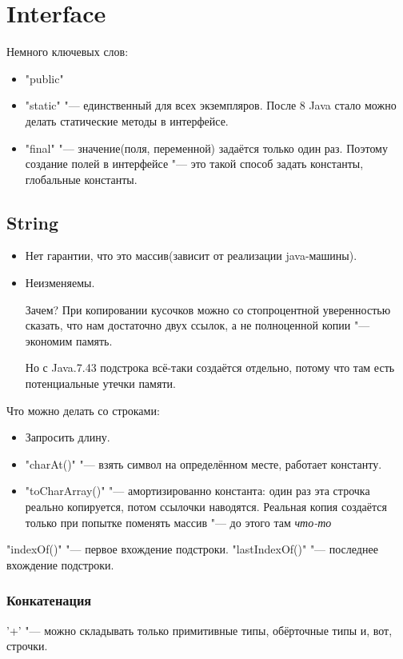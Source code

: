 \chapter{Interface}
Немного ключевых слов:
\begin{itemize}
	\item
		\java"public"
	\item
		\java"static" "--- единственный для всех экземпляров.
			После 8 Java стало можно делать статические методы в интерфейсе.
\item
		\java"final" "--- значение(поля, переменной) задаётся только один раз.
			Поэтому создание полей в интерфейсе "--- 
			это такой способ задать константы, глобальные константы.
		\end{itemize}


\section{String}
\begin{itemize}
	\item
		Нет гарантии, что это массив(зависит от реализации java-машины).
	\item
		Неизменяемы.
		
		Зачем? При копировании кусочков можно со стопроцентной уверенностью сказать, что нам достаточно двух ссылок, а не 
		полноценной копии "--- экономим память.

		Но с Java.7.43 подстрока всё-таки создаётся отдельно, потому что там есть потенциальные утечки памяти.		
\end{itemize}

Что можно делать со строками:
\begin{itemize}
	\item
		Запросить длину.
	\item
		\java"charAt()" "--- взять символ на определённом месте, работает константу.
	\item
		\java"toCharArray()" "--- амортизированно константа: один раз эта строчка реально копируется, потом ссылочки наводятся.
		Реальная копия создаётся только при попытке поменять массив "--- до этого там \it{что-то}
\end{itemize}

\java"indexOf()" "--- первое вхождение подстроки.
\java"lastIndexOf()" "--- последнее вхождение подстроки.

\subsection{Конкатенация}
'+' "--- можно складывать только примитивные типы, обёрточные типы и, вот, строчки.

